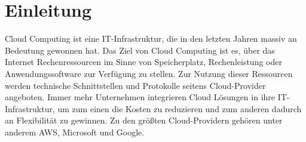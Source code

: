 %
\IEEEpeerreviewmaketitle

\section{Einleitung}
Cloud Computing ist eine IT-Infrastruktur, die in den letzten Jahren massiv an Bedeutung gewonnen hat.
Das Ziel von Cloud Computing ist es, über das Internet Rechenressourcen im Sinne von Speicherplatz, Rechenleistung oder Anwendungssoftware zur Verfügung zu stellen.
Zur Nutzung dieser Ressourcen werden technische Schnittstellen und Protokolle seitens Cloud-Provider angeboten. 
Immer mehr Unternehmen integrieren Cloud Lösungen in ihre IT-Infrastruktur, um zum einen die Kosten zu reduzieren und zum anderen dadurch an Flexibilität zu gewinnen. 
Zu den größten Cloud-Providern gehören unter anderem AWS, Microsoft und Google.
